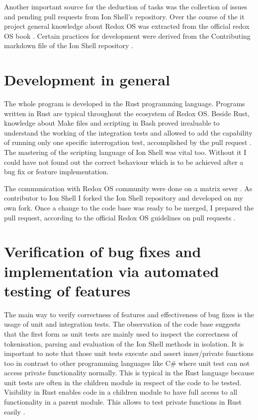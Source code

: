 Another important source for the deduction of tasks was the
collection of issues and pending pull requests from Ion Shell's repository.
Over the course of the it project general knowledge
about Redox OS was extracted from the official redox OS book \cite{redox_os_book}.
Certain practices for development were derived from the Contributing markdown file of the Ion Shell repository \cite{ion_shell_contributing}.

\section{Development in general}

The whole program is developed in the Rust programming language. Programs written in Rust
are typical throughout the ecosystem of Redox OS.
Beside Rust, knowledge about Make files and scripting in Bash proved invaluable to understand the working of the integration tests and
allowed to add the capability of running only one specific interrogation test, accomplished by the pull request \cite{pr_single_test_selectable}.
The mastering of the scripting language of Ion Shell was vital too. Without it I could have not found out the correct behaviour
which is to be achieved after a bug fix or feature implementation.

The communication with Redox OS community were done on a matrix sever \cite{matrix_channel}.
As contributor to Ion Shell I forked the Ion Shell repository and developed on my own fork.
Once a change to the code base was ready to be merged,
I prepared the pull request,
according to the official Redox OS guidelines on pull requests \cite{redox_pr_guideline}.

\section{Verification of bug fixes and implementation via automated testing of features}\label{impl:integration_test}

The main way to verify correctness of features and effectiveness of bug fixes is the usage of unit and integration tests.
The observation of the code base suggests that the first form as unit tests are mainly
used to inspect the correctness of tokenisation, parsing and
evaluation of the Ion Shell methods in isolation.
It is important to note that those unit tests execute and assert inner/private functions too
in contrast to other programming languages like C\# where unit test can not access private functionality normally.
This is typical in the Rust language because unit tests are often in the children module in respect of the code to be tested.
Visibility in Rust enables code in a children module to have full access to all functionality in a parent module.
This allows to test private functions in Rust easily \cite{rust_testing_private_function}.

